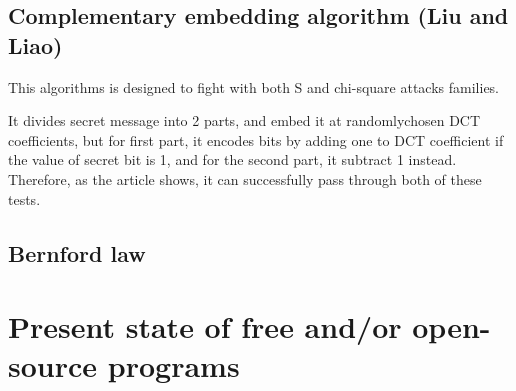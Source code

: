 
\subsection{Complementary embedding algorithm (Liu and Liao)}

This algorithms is designed to fight with both S and chi-square attacks families.

It divides secret message into 2 parts, and embed it at randomlychosen DCT coefficients,
but for first part, it encodes bits by adding one to DCT coefficient if the value of 
secret bit is 1, and for the second part, it subtract 1 instead. Therefore, as the article
\cite{liu2008high} shows, it can successfully pass through both of these tests.

\subsection{Bernford law}

\section{Present state of free and/or open-source programs}
